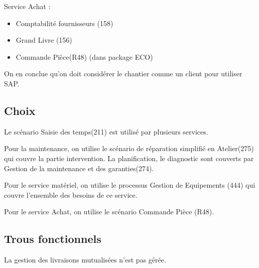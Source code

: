 \documentclass[a4paper]{article}
\begin{document}
Service Achat : \\

\begin{itemize}
    \item Comptabilité fournisseurs (158)
    \item Grand Livre (156)
    \item Commande Pièce(R48) (dans package ECO)
\end{itemize}

On en conclue qu'on doit considérer le chantier comme un client pour utiliser 
SAP.

\subsection{Choix}
Le scénario Saisie des temps(211) est utilisé par plusieurs services.

Pour la maintenance, on utilise le scénario de réparation simplifié en 
Atelier(275) qui couvre la partie intervention.
La planification, le diagnostic sont couverts par Gestion de la maintenance et 
des garanties(274).

Pour le service matériel, on utilise le processus Gestion de Equipements (444) 
qui couvre l'ensemble des besoins de ce service.

Pour le service Achat, on utilise le scénario Commande Pièce (R48). 

\subsection{Trous fonctionnels}

La gestion des livraisons mutualisées n'est pas gérée.

\end{document}
